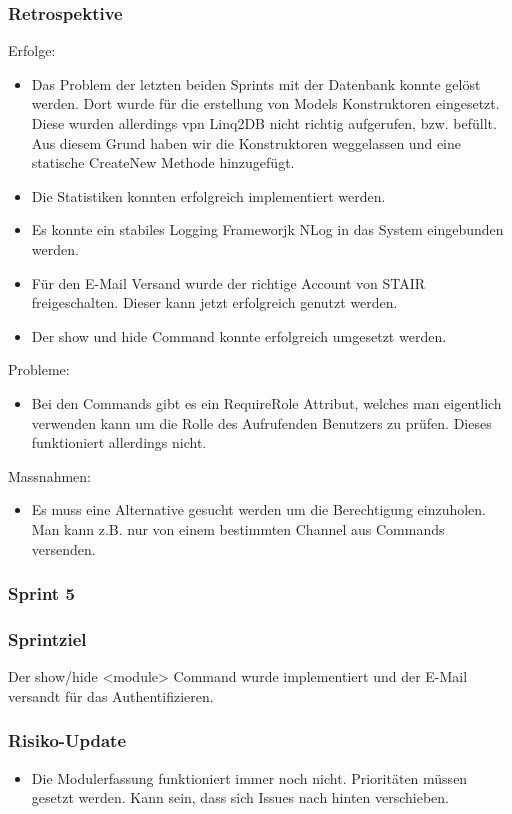 \documentclass[a4paper, table]{article}
\begin{document}
\subsubsection*{Retrospektive}
Erfolge:
\begin{itemize}
    \item Das Problem der letzten beiden Sprints mit der Datenbank konnte gelöst werden.
    Dort wurde für die erstellung von Models Konstruktoren eingesetzt.
    Diese wurden allerdings vpn Linq2DB nicht richtig aufgerufen, bzw. befüllt.
    Aus diesem Grund haben wir die Konstruktoren weggelassen und eine statische CreateNew Methode hinzugefügt.
    \item Die Statistiken konnten erfolgreich implementiert werden.
    \item Es konnte ein stabiles Logging Frameworjk NLog in das System eingebunden werden.
    \item Für den E-Mail Versand wurde der richtige Account von STAIR freigeschalten.
    Dieser kann jetzt erfolgreich genutzt werden.
    \item Der show und hide Command konnte erfolgreich umgesetzt werden.
\end{itemize}
Probleme:
\begin{itemize}
    \item Bei den Commands gibt es ein RequireRole Attribut, welches man eigentlich verwenden kann um die Rolle des Aufrufenden Benutzers zu prüfen.
    Dieses funktioniert allerdings nicht.
\end{itemize}
Massnahmen:
\begin{itemize}
    \item Es muss eine Alternative gesucht werden um die Berechtigung einzuholen.
    Man kann z.B. nur von einem bestimmten Channel aus Commands versenden.
\end{itemize}

\subsubsection{Sprint 5}
\subsubsection*{Sprintziel}
Der show/hide <module> Command wurde implementiert und der E-Mail versandt für das Authentifizieren.

\subsubsection*{Risiko-Update}
\begin{itemize}
    \item Die Modulerfassung funktioniert immer noch nicht.
    Prioritäten müssen gesetzt werden.
    Kann sein, dass sich Issues nach hinten verschieben.
\end{itemize}
\end{document}
